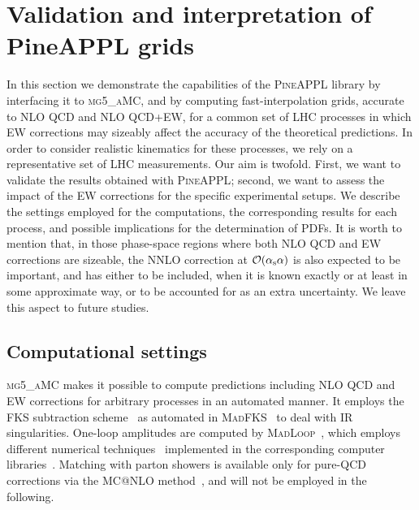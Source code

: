 \section{Validation and interpretation of PineAPPL grids}
\label{sec:results}

In this section we demonstrate the capabilities of the \textsc{PineAPPL}
library by interfacing it to \textsc{mg5\_aMC}, and by
computing fast-interpolation grids, accurate to NLO QCD and NLO QCD+EW,
for a common set of LHC processes in which EW corrections may sizeably
affect the accuracy of the theoretical predictions.
In order to consider realistic kinematics for these
processes, we rely on a representative set of LHC measurements. Our aim is twofold. First, we want to validate the results
obtained with \textsc{PineAPPL}; second, we want to assess the
impact of the EW corrections for the specific experimental setups. We describe
the settings employed for the computations, the corresponding results for
each process, and possible implications for the determination of PDFs. It is worth to mention
that, in those phase-space regions where both NLO QCD and EW corrections are sizeable, the NNLO
correction at $\mathcal O (\alpha_\mathrm{s} \alpha)$ is also expected to be important, and has either to
be included, when it is known exactly or at least in some approximate way, or to be accounted for 
as an extra uncertainty. We leave this aspect to future studies.

\subsection{Computational settings}
\label{subsec:computational_settings}

\textsc{mg5\_aMC} makes it possible
to compute predictions including NLO QCD and EW corrections for arbitrary processes
in an automated manner. It employs the FKS subtraction scheme~\cite{Frixione:1995ms,Frixione:1997np}
as automated in \textsc{MadFKS}~\cite{Frederix:2009yq,Frederix:2016rdc} to deal with IR singularities. One-loop
amplitudes are computed by \textsc{MadLoop}~\cite{Hirschi:2011pa}, which employs different
numerical techniques~\cite{Passarino:1978jh,Davydychev:1991va,Denner:2005nn,Ossola:2006us,Cascioli:2011va,Mastrolia:2012bu} implemented in the corresponding computer libraries~\cite{Ossola:2007ax,Peraro:2014cba,Hirschi:2016mdz,Denner:2016kdg}. Matching
with parton showers is available only for pure-QCD corrections via the MC@NLO method~\cite{Frixione:2002ik}, and 
will not be employed in the following.

